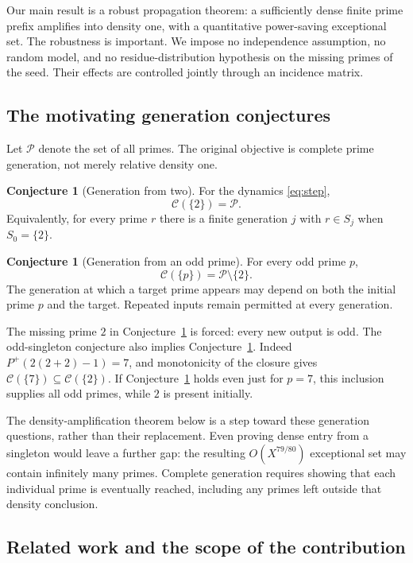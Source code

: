 \documentclass[11pt]{article}
\theoremstyle{definition}
\newtheorem{conjecture}[theorem]{Conjecture}
\theoremstyle{remark}
\newcommand{\PP}{\mathcal P}
\newcommand{\Cl}{\mathcal C}
\begin{document}
Our main result is a robust propagation theorem: a sufficiently dense
finite prime prefix amplifies into density one, with a quantitative
power-saving exceptional set. The robustness is important. We impose
no independence assumption, no random model, and no residue-distribution
hypothesis on the missing primes of the seed. Their effects are controlled
jointly through an incidence matrix.

\subsection{The motivating generation conjectures}\label{sec:conjectures}

Let \(\PP\) denote the set of all primes. The original objective is
complete prime generation, not merely relative density one.

\begin{conjecture}[Generation from two]\label{conj:two}
For the dynamics \eqref{eq:step},
\[
 \Cl(\{2\})=\PP.
\]
Equivalently, for every prime \(r\) there is a finite generation \(j\)
with \(r\in S_j\) when \(S_0=\{2\}\).
\end{conjecture}

\begin{conjecture}[Generation from an odd prime]\label{conj:odd}
For every odd prime \(p\),
\[
 \Cl(\{p\})=\PP\setminus\{2\}.
\]
The generation at which a target prime appears may depend on both the
initial prime \(p\) and the target. Repeated inputs remain permitted at
every generation.
\end{conjecture}

The missing prime \(2\) in Conjecture~\ref{conj:odd} is forced: every
new output is odd. The odd-singleton conjecture also implies
Conjecture~\ref{conj:two}. Indeed \(P^{+}(2(2+2)-1)=7\), and monotonicity
of the closure gives
\(\Cl(\{7\})\subseteq\Cl(\{2\})\).
If Conjecture~\ref{conj:odd} holds even just for \(p=7\), this inclusion
supplies all odd primes, while \(2\) is present initially.

The density-amplification theorem below is a step toward these
generation questions, rather than their replacement. Even proving dense
entry from a singleton would leave a further gap: the resulting
\(O(X^{79/80})\) exceptional set may contain infinitely many primes.
Complete generation requires showing that each individual prime is
eventually reached, including any primes left outside that density
conclusion.

\subsection{Related work and the scope of the contribution}
\end{document}
